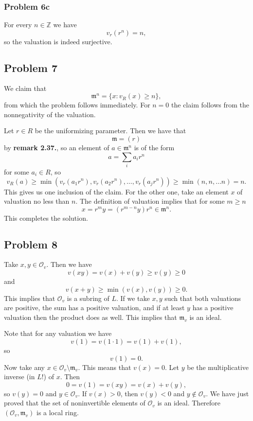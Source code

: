 \subsubsection*{Problem 6c}

For every \( n \in \mathbb{Z} \) we have
\[ 
    v_r(r^n) = n,   
\]
so the valuation is indeed surjective.

\subsection*{Problem 7}

We claim that
\[ 
    \mathfrak{m}^n = \{ x : v_R(x) \geqslant n \}, 
\]
from which the problem follows immediately. For \( n = 0 \) the claim follows
from the nonnegativity of the valuation.

Let \( r \in R \) be the uniformizing parameter. Then we have that 
\[ 
    \mathfrak{m} = (r)
\]
by {\bf remark 2.37.}, so an element of \(a \in \mathfrak{m}^n \) is of the form
\[ 
    a = \sum_i a_i r^n
\]
for some \( a_i \in R \), so 
\[ 
    v_R(a) \geqslant \min (v_r(a_1r^n), v_r(a_2r^n), \ldots, v_r(a_jr^n))
    \geqslant \min ( n, n, \ldots n ) = n.
\]
This gives us one inclusion of the claim. For the other one, take an element
\( x \) of valuation no less than \( n \). The definition of valuation implies
that for some \( m \geqslant n \)
\[ 
    x = r^m y = (r^{m-n}y) r^n \in \mathfrak{m}^n.
\]
This completes the solution.


\subsection*{Problem 8}

Take \( x, y \in \mathcal{O}_v \). Then we have
\[ 
v(xy) = v(x) + v(y) \geqslant v(y) \geqslant 0
\]
and
\[ 
    v(x + y) \geqslant \min (v(x), v(y)) \geqslant 0. 
\]
This implies that \( \mathcal{O}_v \) is a subring of \( L \).
If we take \( x,y \) such that both valuations are positive, the sum has
a positive valuation, and if at least \( y \) has a positive valuation
then the product does as well. This implies that \( \mathfrak{m}_v \) is an ideal.

Note that for any valuation we have
\[ 
    v(1) = v(1 \cdot 1) = v(1) + v(1), 
\]
so
\[ 
    v(1) = 0. 
\]
Now take any \( x \in \mathcal{O}_v \setminus \mathfrak{m}_v \). This means
that \( v(x) = 0 \). Let \( y \) be the multiplicative inverse (in \( L \)!)
of \( x \). Then
\[ 
    0 = v(1) = v(xy) = v(x) + v(y), 
\]
so \( v(y) = 0\) and \( y \in \mathcal{O}_v \). If \( v(x) > 0 \), then \( v(y) < 0\)
and \( y \not\in \mathcal{O}_v \). We have just proved that the set of noninvertible
elements of \( \mathcal{O}_v \) is an ideal. Therefore \( (\mathcal{O}_v, \mathfrak{m}_v) \)
is a local ring.


